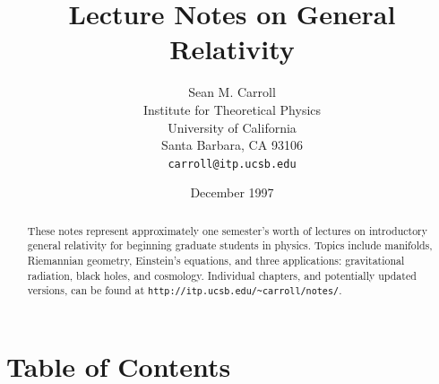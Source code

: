 \documentclass[12pt]{article}
\begin{document}
\newcommand{\be}{\begin{equation}}
\newcommand{\ee}{\end{equation}}
\newcommand{\bea}{\begin{eqnarray}}
\newcommand{\eea}{\end{eqnarray}}

\def\boxx{\Box}
\def\mn{{\mu\nu}}
\def\e#1{{\hat e}_{(#1)}}
\def\t#1{{\hat \theta}^{(#1)}}
\def\p#1{{\partial}_{#1}}
\def\d{{\rm d}}
\def\R{{\bf R}}
\def\g{{\sqrt{-g}}}
\def\tr{\mathop{\rm Tr}\nolimits}
\def\lie{\pounds}
\def\bh{{\bar h}}
\def\x{{\bf x}}
\def\y{{\bf y}}
\def\k{{\bf k}}

\thispagestyle{plain}
\setcounter{page}{0}

\title{Lecture Notes on General Relativity}

\author{Sean M. Carroll \\ Institute for Theoretical Physics \\
University of California \\ Santa Barbara, CA 93106 \\
{\tt carroll@itp.ucsb.edu}}

\date{December 1997}

\maketitle

\begin{abstract}
These notes represent approximately one semester's worth of lectures
on introductory general relativity for beginning graduate students
in physics.  Topics include manifolds, Riemannian geometry,
Einstein's equations, and three applications: gravitational radiation,
black holes, and cosmology.
Individual chapters, and potentially updated versions, can be found at
{\tt http://itp.ucsb.edu/{\~{}}carroll/notes/}.
\end{abstract}

\vfill


\eject

\section*{Table of Contents}
\end{document}
